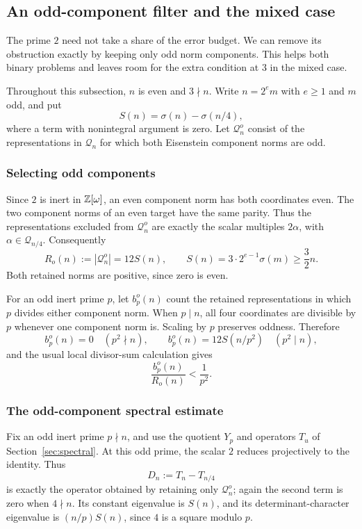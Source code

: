 \subsection{An odd-component filter and the mixed case}\label{sec:odd-ramified}
The prime $2$ need not take a share of the error budget. We can remove
its obstruction exactly by keeping only odd norm components. This helps
both binary problems and leaves room for the extra condition at $3$ in
the mixed case.

Throughout this subsection, $n$ is even and $3\nmid n$. Write $n=2^e m$
with $e\ge1$ and $m$ odd, and put
\[
S(n)=\sigma(n)-\sigma(n/4),
\]
where a term with nonintegral argument is zero. Let $\mathcal Q_n^o$
consist of the representations in $\mathcal Q_n$ for which both
Eisenstein component norms are odd.

\subsubsection{Selecting odd components}
Since $2$ is inert in $\mathbb Z[\omega]$, an even component norm has both
coordinates even. The two component norms of an even target have the
same parity. Thus the representations excluded from $\mathcal Q_n^o$
are exactly the scalar multiples $2\alpha$, with
$\alpha\in\mathcal Q_{n/4}$. Consequently
\begin{equation}\label{eq:odd-count}
R_o(n):=|\mathcal Q_n^o|=12S(n),\qquad
S(n)=3\cdot2^{e-1}\sigma(m)\ge\frac32n.
\end{equation}
Both retained norms are positive, since zero is even.

For an odd inert prime $p$, let $b_p^o(n)$ count the retained
representations in which $p$ divides either component norm. When $p\mid n$,
all four coordinates are divisible by $p$ whenever one component norm is.
Scaling by $p$ preserves oddness. Therefore
\[
b_p^o(n)=0\quad(p^2\nmid n),\qquad
b_p^o(n)=12S(n/p^2)\quad(p^2\mid n),
\]
and the usual local divisor-sum calculation gives
\begin{equation}\label{eq:odd-dividing}
\frac{b_p^o(n)}{R_o(n)}<\frac1{p^2}.
\end{equation}

\subsubsection{The odd-component spectral estimate}
Fix an odd inert prime $p\nmid n$, and use the quotient $Y_p$ and
operators $T_u$ of Section~\ref{sec:spectral}. At this odd prime, the
scalar $2$ reduces projectively to the identity. Thus
\[
D_n:=T_n-T_{n/4}
\]
is exactly the operator obtained by retaining only $\mathcal Q_n^o$;
again the second term is zero when $4\nmid n$. Its constant eigenvalue
is $S(n)$, and its determinant-character eigenvalue is
$(n/p)S(n)$, since $4$ is a square modulo $p$.

